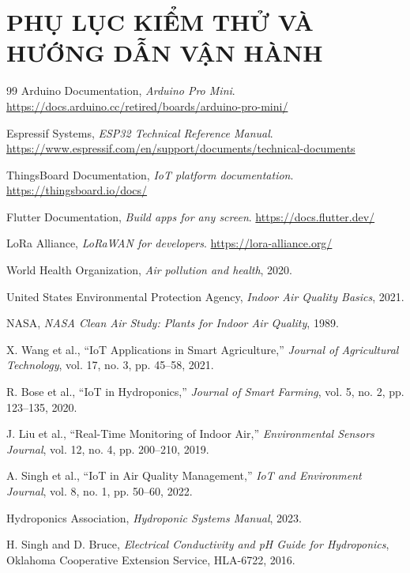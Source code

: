 \documentclass[14pt,a4paper]{report}
\begin{document}
\chapter{PHỤ LỤC KIỂM THỬ VÀ HƯỚNG DẪN VẬN HÀNH}


\begin{thebibliography}{99}
Arduino Documentation, \textit{Arduino Pro Mini}.
\url{https://docs.arduino.cc/retired/boards/arduino-pro-mini/}

Espressif Systems, \textit{ESP32 Technical Reference Manual}.
\url{https://www.espressif.com/en/support/documents/technical-documents}

ThingsBoard Documentation, \textit{IoT platform documentation}.
\url{https://thingsboard.io/docs/}

Flutter Documentation, \textit{Build apps for any screen}.
\url{https://docs.flutter.dev/}

LoRa Alliance, \textit{LoRaWAN for developers}.
\url{https://lora-alliance.org/}

World Health Organization, \textit{Air pollution and health}, 2020.

United States Environmental Protection Agency, \textit{Indoor Air Quality Basics}, 2021.

NASA, \textit{NASA Clean Air Study: Plants for Indoor Air Quality}, 1989.

X. Wang et al., ``IoT Applications in Smart Agriculture,'' \textit{Journal of Agricultural Technology}, vol. 17, no. 3, pp. 45--58, 2021.

R. Bose et al., ``IoT in Hydroponics,'' \textit{Journal of Smart Farming}, vol. 5, no. 2, pp. 123--135, 2020.

J. Liu et al., ``Real-Time Monitoring of Indoor Air,'' \textit{Environmental Sensors Journal}, vol. 12, no. 4, pp. 200--210, 2019.

A. Singh et al., ``IoT in Air Quality Management,'' \textit{IoT and Environment Journal}, vol. 8, no. 1, pp. 50--60, 2022.

Hydroponics Association, \textit{Hydroponic Systems Manual}, 2023.

H. Singh and D. Bruce, \textit{Electrical Conductivity and pH Guide for Hydroponics}, Oklahoma Cooperative Extension Service, HLA-6722, 2016.


\end{thebibliography}
\end{document}
